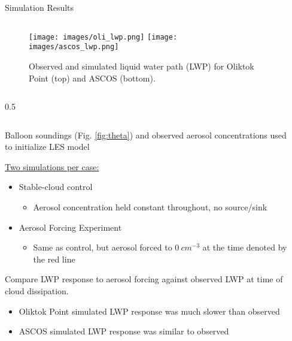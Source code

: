 \documentclass[final]{beamer}
\newlength{\sepwid}
\newlength{\twocolwid}
\begin{document}
\begin{frame}[t]
\begin{columns}[t]
\begin{column}{\twocolwid}
	\begin{alertblock}{Simulation Results}
		\begin{column}{0.59\linewidth}
			\begin{figure}
				\centering
				\texttt{[image: images/oli\_lwp.png]}
				\texttt{[image: images/ascos\_lwp.png]}
				\caption{Observed and simulated liquid water path (LWP) for Oliktok Point (top) and ASCOS (bottom).}\label{fig:simulations}
			\end{figure}
		\end{column}
		\begin{column}{0.5\sepwid}\end{column}
		\begin{column}{0.39\linewidth}
			Balloon soundings (Fig. \ref{fig:theta}) and observed aerosol concentrations used to initialize LES model
			\vspace{1 em}
			
			\underline{Two simulations per case:}
			\begin{itemize}
				\item Stable-cloud control
				\begin{itemize}
					\item Aerosol concentration held constant throughout, no source/sink
				\end{itemize}
				\item Aerosol Forcing Experiment
				\begin{itemize}
					\item Same as control, but aerosol forced to $0\ cm^{-3}$ at the time denoted by the red line
				\end{itemize}
			\end{itemize}
			\vspace{1 em}

			Compare LWP response to aerosol forcing against observed LWP at time of cloud dissipation.
			\begin{itemize}
				\item Oliktok Point simulated LWP response was much slower than observed
				\item ASCOS simulated LWP response was similar to observed
			\end{itemize}
		\end{column}
	\end{alertblock}
\end{column}



\begin{column}{\sepwid}\end{column}


\end{columns}
\end{frame}
\end{document}
